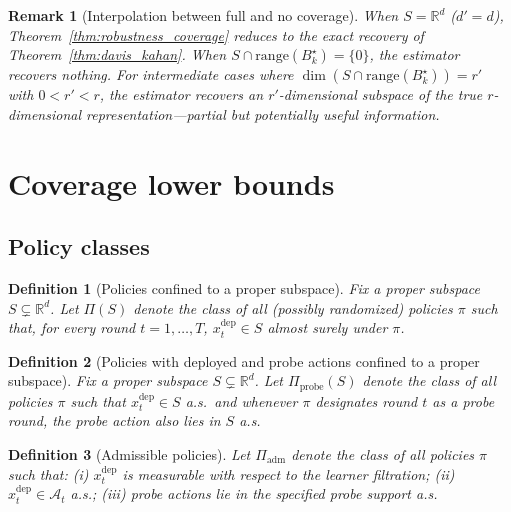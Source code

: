 \documentclass[12pt]{article}
\newcommand{\R}{\mathbb{R}}
\newcommand{\cA}{\mathcal{A}}
\newcommand{\range}{\mathrm{range}}
\newtheorem{definition}{Definition}
\newtheorem{remark}{Remark}
\theoremstyle{plain}
\theoremstyle{definition}
\begin{document}
\begin{remark}[Interpolation between full and no coverage]
When $S = \R^d$ ($d' = d$), Theorem~\ref{thm:robustness_coverage} reduces to the exact recovery of Theorem~\ref{thm:davis_kahan}. When $S \cap \range(B_k^\star) = \{0\}$, the estimator recovers nothing. For intermediate cases where $\dim(S \cap \range(B_k^\star)) = r'$ with $0 < r' < r$, the estimator recovers an $r'$-dimensional subspace of the true $r$-dimensional representation---partial but potentially useful information.
\end{remark}


\section{Coverage lower bounds}
\label{sec:coverage_lower_bounds}

\subsection{Policy classes}

\begin{definition}[Policies confined to a proper subspace]
\label{def:restricted_policy}
Fix a proper subspace $S \subsetneq \R^d$. Let $\Pi(S)$ denote the class of all (possibly randomized) policies $\pi$ such that, for every round $t = 1, \dots, T$, $x_t^{\mathrm{dep}} \in S$ almost surely under $\pi$.
\end{definition}

\begin{definition}[Policies with deployed and probe actions confined to a proper subspace]
\label{def:restricted_probe_policy}
Fix a proper subspace $S \subsetneq \R^d$. Let $\Pi_{\mathrm{probe}}(S)$ denote the class of all policies $\pi$ such that $x_t^{\mathrm{dep}} \in S$ a.s.\ and whenever $\pi$ designates round $t$ as a probe round, the probe action also lies in $S$ a.s.
\end{definition}

\begin{definition}[Admissible policies]
\label{def:admissible}
Let $\Pi_{\mathrm{adm}}$ denote the class of all policies $\pi$ such that: (i) $x_t^{\mathrm{dep}}$ is measurable with respect to the learner filtration; (ii) $x_t^{\mathrm{dep}} \in \cA_t$ a.s.; (iii) probe actions lie in the specified probe support a.s.
\end{definition}
\end{document}
